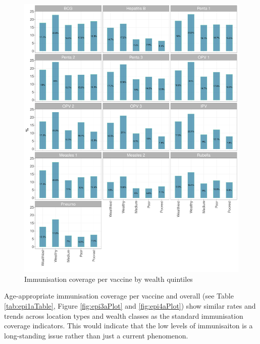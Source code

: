 \documentclass[12pt,a4paper]{article}
\begin{document}
\begin{figure}[H]

{\centering \includegraphics{kayahReport_files/figure-latex/epi4plot-1} 

}

\caption{Immunisation coverage per vaccine by wealth quintiles}\label{fig:epi4plot}
\end{figure}

Age-appropriate immunisation coverage per vaccine and overall (see Table \ref{tab:epi1aTable}, Figure \ref{fig:epi3aPlot} and \ref{fig:epi4aPlot}) show similar rates and trends across location types and wealth classes as the standard immunisation coverage indicators. This would indicate that the low levels of immunisaiton is a long-standing issue rather than just a current phenomenon.
\end{document}
